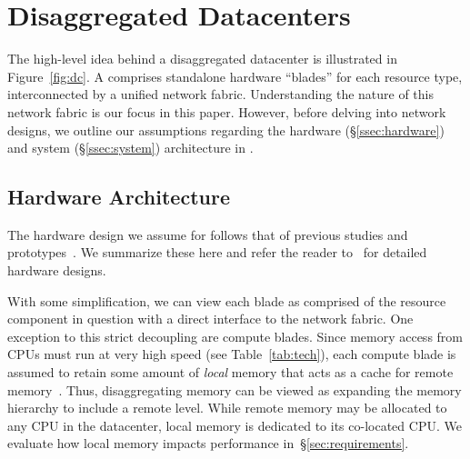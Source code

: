 \vspace{-0.1in}
\section{Disaggregated Datacenters}
\vspace{-0.05in}
\label{sec:summary}

The high-level idea behind a disaggregated datacenter is illustrated in Figure~\ref{fig:dc}.
A \dis comprises standalone hardware “blades” for each resource type, %
interconnected by a unified network fabric. Understanding the nature of this network fabric is our focus in this paper.
However, before delving into network designs, we outline our assumptions regarding the hardware (\S\ref{ssec:hardware}) and system (\S\ref{ssec:system}) architecture in \dis. 


\vspace{-0.25in}
\subsection{Hardware Architecture}
\vspace{-0.05in}
\label{ssec:hardware}
The hardware design we assume for \dis follows that of previous studies and prototypes~\cite{ddcHwDesign1, ddcHwDesign2, ddcHwDesign3, rsa, hptm, fdr, sonuma, firebox}. We summarize these here and refer the reader to~\cite{ddcHwDesign1, ddcHwDesign2, ddcHwDesign3} for detailed hardware designs.%


With some simplification, we can view each blade as comprised of the resource component in question with a direct interface to the network fabric. 
One exception to this strict decoupling are compute blades. Since memory access from CPUs must run at very high speed (see Table~\ref{tab:tech}), each compute blade is assumed to retain some amount of \emph{local} memory that acts as a cache for remote memory~\cite{ddcHwDesign1, ddcHwDesign2}. Thus, disaggregating memory can be viewed as expanding the memory hierarchy to include a remote level. While remote memory may be allocated to any CPU in the datacenter, local memory is dedicated to its co-located CPU. We evaluate how local memory impacts performance in~\S\ref{sec:requirements}. 


